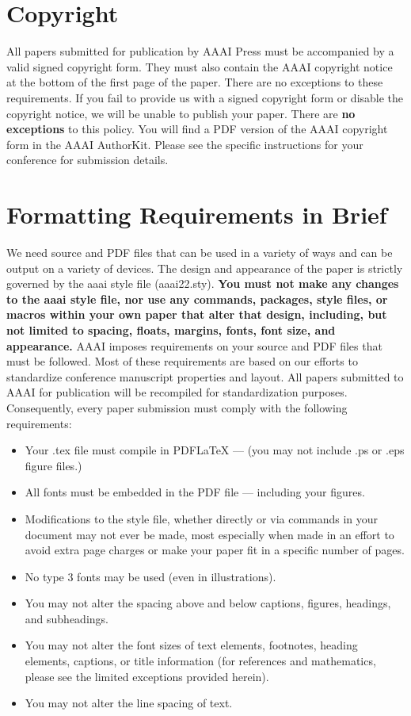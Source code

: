\documentclass[letterpaper]{article} %
\begin{document}
\section{Copyright}
All papers submitted for publication by AAAI Press must be accompanied by a valid signed copyright form. They must also contain the AAAI copyright notice at the bottom of the first page of the paper. There are no exceptions to these requirements. If you fail to provide us with a signed copyright form or disable the copyright notice, we will be unable to publish your paper. There are \textbf{no exceptions} to this policy. You will find a PDF version of the AAAI copyright form in the AAAI AuthorKit. Please see the specific instructions for your conference for submission details.

\section{Formatting Requirements in Brief}
We need source and PDF files that can be used in a variety of ways and can be output on a variety of devices. The design and appearance of the paper is strictly governed by the aaai style file (aaai22.sty).
\textbf{You must not make any changes to the aaai style file, nor use any commands, packages, style files, or macros within your own paper that alter that design, including, but not limited to spacing, floats, margins, fonts, font size, and appearance.} AAAI imposes requirements on your source and PDF files that must be followed. Most of these requirements are based on our efforts to standardize conference manuscript properties and layout. All papers submitted to AAAI for publication will be recompiled for standardization purposes. Consequently, every paper submission must comply with the following requirements:

\begin{itemize}
\item Your .tex file must compile in PDF\LaTeX{} --- (you may not include .ps or .eps figure files.)
\item All fonts must be embedded in the PDF file --- including your figures.
\item Modifications to the style file, whether directly or via commands in your document may not ever be made, most especially when made in an effort to avoid extra page charges or make your paper fit in a specific number of pages.
\item No type 3 fonts may be used (even in illustrations).
\item You may not alter the spacing above and below captions, figures, headings, and subheadings.
\item You may not alter the font sizes of text elements, footnotes, heading elements, captions, or title information (for references and mathematics, please see the limited exceptions provided herein).
\item You may not alter the line spacing of text.
\end{itemize}
\end{document}
